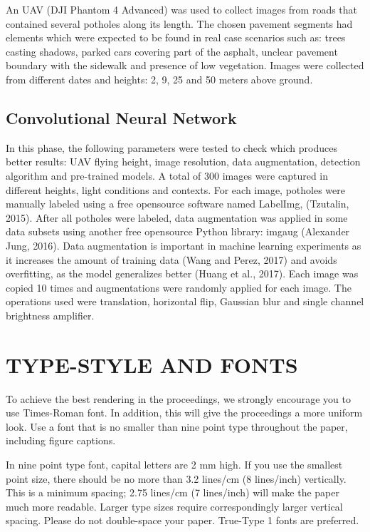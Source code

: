 \documentclass{article}
\begin{document}
An UAV (DJI Phantom 4 Advanced) was used to collect images from roads that contained several potholes along its length. The chosen pavement segments had elements which were expected to be found in real case scenarios such as: trees casting shadows, parked cars covering part of the asphalt, unclear pavement boundary with the sidewalk and presence of low vegetation. Images were collected from different dates and heights: 2, 9, 25 and 50 meters above ground. 


\subsection{Convolutional Neural Network}
\label{sec:pagestyle}

In this phase, the following parameters were tested to check which produces better results: UAV flying height, image resolution, data augmentation, detection algorithm and pre-trained models.
A total of 300 images were captured in different heights, light conditions and contexts. For each image, potholes were manually labeled using a free opensource software named LabelImg, (Tzutalin, 2015). After all potholes were labeled, data augmentation was applied in some data subsets using another free opensource Python library: imgaug (Alexander Jung, 2016). Data augmentation is important in machine learning experiments as it increases the amount of training data (Wang and Perez, 2017) and avoids overfitting, as the model generalizes better (Huang et al., 2017). Each image was copied 10 times and augmentations were randomly applied for each image. The operations used were translation, horizontal flip, Gaussian blur and single channel brightness amplifier. 

\section{TYPE-STYLE AND FONTS}
\label{sec:typestyle}

To achieve the best rendering in the proceedings, we
strongly encourage you to use Times-Roman font.  In addition, this will give
the proceedings a more uniform look.  Use a font that is no smaller than nine
point type throughout the paper, including figure captions.

In nine point type font, capital letters are 2 mm high.  If you use the
smallest point size, there should be no more than 3.2 lines/cm (8 lines/inch)
vertically.  This is a minimum spacing; 2.75 lines/cm (7 lines/inch) will make
the paper much more readable.  Larger type sizes require correspondingly larger
vertical spacing.  Please do not double-space your paper.  True-Type 1 fonts
are preferred.
\end{document}

